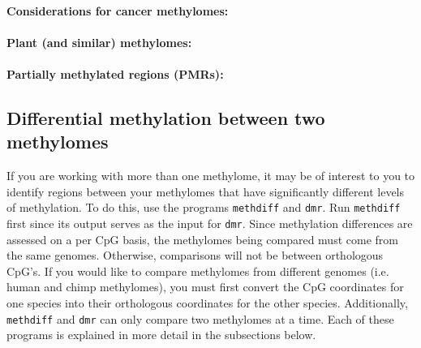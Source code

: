 \documentclass[10pt]{article}
\newcommand{\prog}[1]{\texttt{#1}}
\begin{document}

\paragraph{Considerations for cancer methylomes:}

\paragraph{Plant (and similar) methylomes:}

\paragraph{Partially methylated regions (PMRs):}





\subsection{Differential methylation between two methylomes}
\label{sec:differential_methylation}

If you are working with more than one methylome, it may be of interest
to you to identify regions between your methylomes that have
significantly different levels of methylation. To do this, use the
programs \prog{methdiff} and \prog{dmr}. Run \prog{methdiff}
first since its output serves as the input for \prog{dmr}. Since
methylation differences are assessed on a per CpG basis, the
methylomes being compared must come from the same genomes. Otherwise,
comparisons will not be between orthologous CpG's. If you would like
to compare methylomes from different genomes (i.e. human and chimp
methylomes), you must first convert the CpG coordinates for one
species into their orthologous coordinates for the other
species. Additionally, \prog{methdiff} and \prog{dmr} can only
compare two methylomes at a time. Each of these programs is explained
in more detail in the subsections below.
\end{document}
